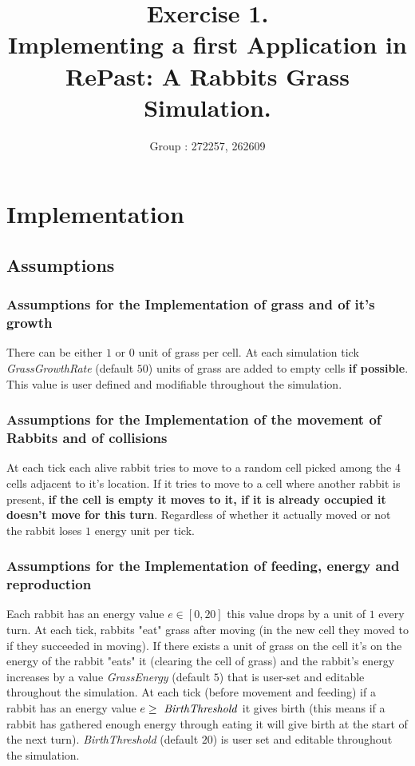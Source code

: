 \documentclass[11pt]{article}
\title{\bf Exercise 1.\\ Implementing a first Application in RePast: A Rabbits Grass Simulation.}
\author{Group \textnumero: 272257, 262609}
\begin{document}
\maketitle

\section{Implementation}


\subsection{Assumptions}

\subsubsection{Assumptions for the Implementation of grass and of it's growth}

There can be either $1$ or $0$ unit of grass per cell. At each simulation tick \textit{GrassGrowthRate} (default $50$) units of grass are added to empty cells \textbf{if possible}. This value is user defined and modifiable throughout the simulation.

\subsubsection{Assumptions for the Implementation of the movement of Rabbits and of collisions}

At each tick each alive rabbit tries to move to a random cell picked among the 4 cells adjacent to it's location. If it tries to move to a cell where another rabbit is present, \textbf{if the cell is empty it moves to it, if it is already occupied it doesn't move for this turn}. Regardless of whether it actually moved or not the rabbit loses $1$ energy unit per tick.

\subsubsection{Assumptions for the Implementation of feeding, energy and reproduction}

Each rabbit has an energy value $e \in [0,20]$ this value drops by a unit of $1$ every turn. At each tick, rabbits "eat" grass after moving (in the new cell they moved to if they succeeded in moving). If there exists a unit of grass on the cell it's on the energy of the rabbit "eats" it (clearing the cell of grass) and the rabbit's energy increases by a value \textit{GrassEnergy} (default $5$) that is user-set and editable throughout the simulation. At each tick (before movement and feeding) if a rabbit has an energy value $e \geq \text{ \textit{BirthThreshold}}$ it gives birth (this means if a rabbit has gathered enough energy through eating it will give birth at the start of the next turn). \textit{BirthThreshold} (default $20$) is user set and editable throughout the simulation. 
\end{document}
